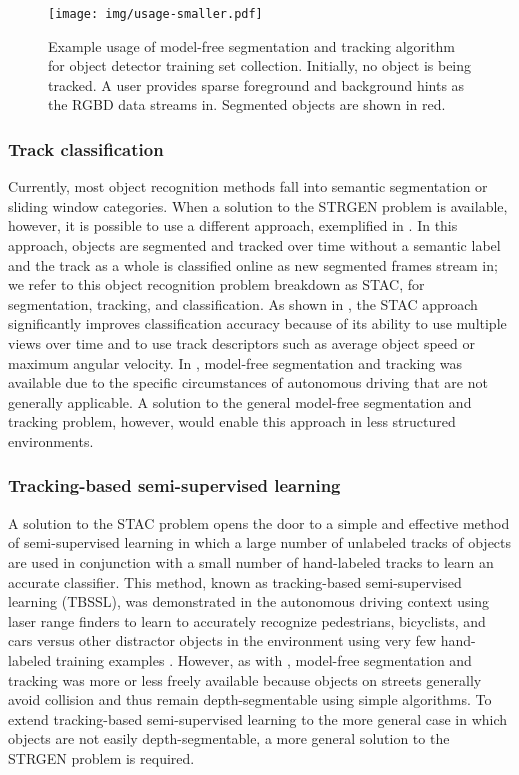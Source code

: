 \documentclass[journal]{IEEEtran}
\newcommand{\todoCR}[1]{}
\begin{document}
\begin{figure}
  \centering
  \texttt{[image: img/usage-smaller.pdf]}
  \caption{Example usage of model-free segmentation and tracking algorithm for object detector training set collection.  Initially, no object is being tracked.  A user provides sparse foreground and background hints as the RGBD data streams in.  Segmented objects are shown in red. \todoCR{Show pose changes, fix focus}}
  \label{fig:usage}
\end{figure}

\subsubsection{Track classification}

Currently, most object recognition methods fall into semantic segmentation or sliding window categories.  When a solution to the STRGEN problem is available, however, it is possible to use a different approach, exemplified in \cite{teichman2011a}.  In this approach, objects are segmented and tracked over time without a semantic label and the track as a whole is classified online as new segmented frames stream in; we refer to this object recognition problem breakdown as STAC, for segmentation, tracking, and classification.  As shown in \cite{teichman2011a}, the STAC approach significantly improves classification accuracy because of its ability to use multiple views over time and to use track descriptors such as average object speed or maximum angular velocity.  In \cite{teichman2011a}, model-free segmentation and tracking was available due to the specific circumstances of autonomous driving that are not generally applicable.  A solution to the general model-free segmentation and tracking problem, however, would enable this approach in less structured environments.

\subsubsection{Tracking-based semi-supervised learning}

A solution to the STAC problem opens the door to a simple and effective method of semi-supervised learning in which a large number of unlabeled tracks of objects are used in conjunction with a small number of hand-labeled tracks to learn an accurate classifier.  This method, known as tracking-based semi-supervised learning (TBSSL), was demonstrated in the autonomous driving context using laser range finders to learn to accurately recognize pedestrians, bicyclists, and cars versus other distractor objects in the environment using very few hand-labeled training examples \cite{teichman2011b}. However, as with \cite{teichman2011a}, model-free segmentation and tracking was more or less freely available because objects on streets generally avoid collision and thus remain depth-segmentable using simple algorithms.  To extend tracking-based semi-supervised learning to the more general case in which objects are not easily depth-segmentable, a more general solution to the STRGEN problem is required.
\end{document}

